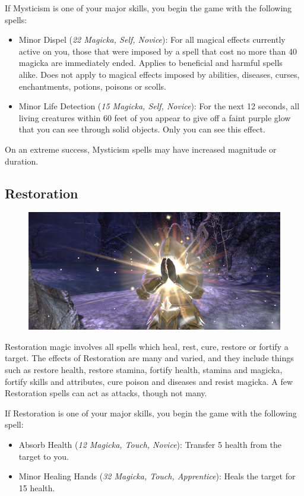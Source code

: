 \documentclass[12pt]{book}
\begin{document}
If Mysticism is one of your major skills, you begin the game with the following spells:
\begin{itemize}
	\item Minor Dispel (\textit{22 Magicka, Self, Novice}): For all magical effects currently active on you, those that were imposed by a spell that cost no more than 40 magicka are immediately ended. Applies to beneficial and harmful spells alike. Does not apply to magical effects imposed by abilities, diseases, curses, enchantments, potions, poisons or scolls.
	\item Minor Life Detection (\textit{15 Magicka, Self, Novice}): For the next 12 seconds, all living creatures within 60 feet of you appear to give off a faint purple glow that you can see through solid objects. Only you can see this effect.
\end{itemize}

On an extreme success, Mysticism spells may have increased magnitude or duration.

\subsection{Restoration}

\begin{figure}[H]
	\includegraphics[width=\textwidth]{healing.png}
\end{figure}

Restoration magic involves all spells which heal, rest, cure, restore or fortify a target. The effects of Restoration are many and varied, and they include things such as restore health, restore stamina, fortify health, stamina and magicka, fortify skills and attributes, cure poison and diseases and resist magicka. A few Restoration spells can act as attacks, though not many.

If Restoration is one of your major skills, you begin the game with the following spell:
\begin{itemize}
	\item Absorb Health (\textit{12 Magicka, Touch, Novice}): Transfer 5 health from the target to you.
	\item Minor Healing Hands (\textit{32 Magicka, Touch, Apprentice}): Heals the target for 15 health.
\end{itemize}
\end{document}
